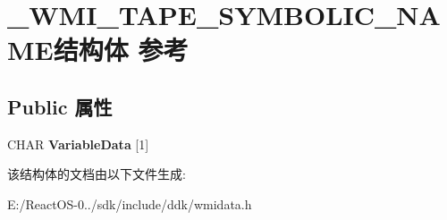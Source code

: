 \hypertarget{struct___w_m_i___t_a_p_e___s_y_m_b_o_l_i_c___n_a_m_e}{}\section{\+\_\+\+W\+M\+I\+\_\+\+T\+A\+P\+E\+\_\+\+S\+Y\+M\+B\+O\+L\+I\+C\+\_\+\+N\+A\+M\+E结构体 参考}
\label{struct___w_m_i___t_a_p_e___s_y_m_b_o_l_i_c___n_a_m_e}
\subsection*{Public 属性}
\begin{DoxyCompactItemize}
\item 
\mbox{\label{struct___w_m_i___t_a_p_e___s_y_m_b_o_l_i_c___n_a_m_e_a61274118a6fa309c82d9886ec54b0603}} 
C\+H\+AR {\bfseries Variable\+Data} \mbox{[}1\mbox{]}
\end{DoxyCompactItemize}


该结构体的文档由以下文件生成\+:\begin{DoxyCompactItemize}
\item 
E\+:/\+React\+O\+S-\/0../sdk/include/ddk/wmidata.\+h\end{DoxyCompactItemize}
